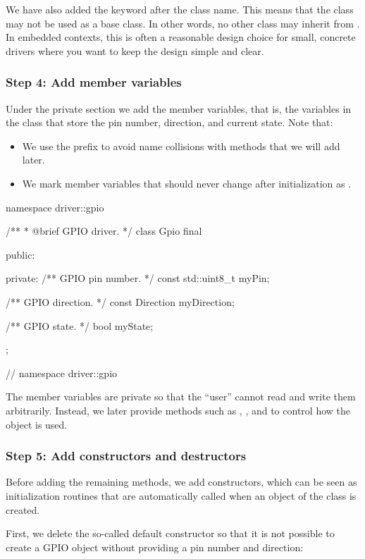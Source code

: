 We have also added the keyword  after the class name. This means that the class may not
be used as a base class. In other words, no other class may inherit from . In embedded
contexts, this is often a reasonable design choice for small, concrete drivers where you want to
keep the design simple and clear.

\subsubsection{Step 4: Add member variables}
Under the private section we add the member variables, that is, the variables in the class that
store the pin number, direction, and current state. Note that:
\begin{itemize}
  \item We use the prefix  to avoid name collisions with methods that we will add later.
  \item We mark member variables that should never change after initialization as .
\end{itemize}

\begin{cppcode}
namespace driver::gpio
{
/**
 * @brief GPIO driver.
 */
class Gpio final
{
public:

private:
    /** GPIO pin number. */
    const std::uint8_t myPin;

    /** GPIO direction. */
    const Direction myDirection;

    /** GPIO state. */
    bool myState;
};
} // namespace driver::gpio
\end{cppcode}

\noindent The member variables are private so that the ``user'' cannot read and write them
arbitrarily. Instead, we later provide methods such as , , and
 to control how the object is used.

\subsubsection{Step 5: Add constructors and destructors}
Before adding the remaining methods, we add constructors, which can be seen as initialization
routines that are automatically called when an object of the class is created.

First, we delete the so-called default constructor so that it is not possible to create a GPIO
object without providing a pin number and direction:

